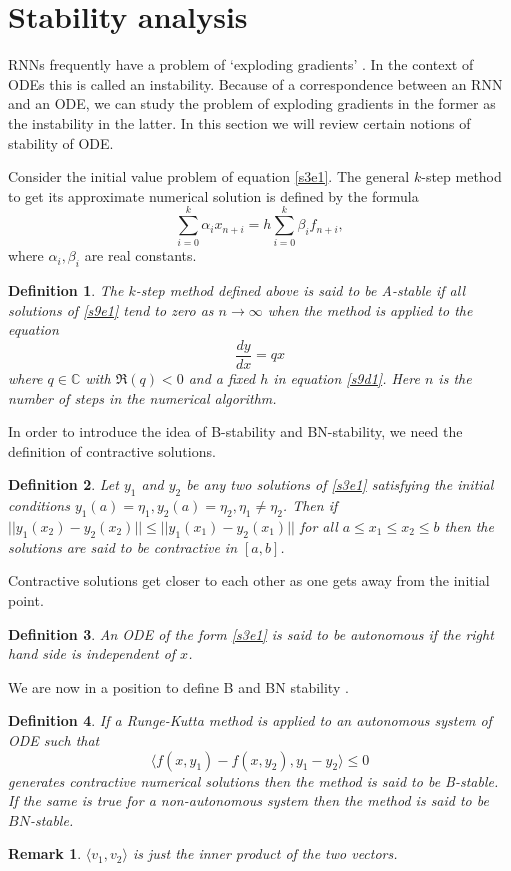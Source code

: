 \documentclass{article}
\numberwithin{equation}{section}
\newtheorem{defn}{Definition}
\newtheorem*{rem}{Remark}
\begin{document}
\section{Stability analysis}\label{s9}
RNNs frequently have a problem of `exploding gradients'
\cite{gereon2018hands}. In the context of ODEs this is called an 
instability. Because of a correspondence between an RNN and an ODE, we 
can study the problem of exploding gradients in the former as the 
instability in the latter. In this section we will review certain notions
of stability of ODE.

Consider the initial value problem of equation \eqref{s3e1}. The general
$k$-step method to get its approximate numerical solution is defined by
the formula\cite{dahlquist1963special}
\begin{equation}\label{s9e1}
\sum_{i=0}^k \alpha_i x_{n+i} = h\sum_{i=0}^k \beta_i f_{n+i},
\end{equation}
where $\alpha_i, \beta_i$ are real constants.
\begin{defn}\label{s9d1}
The $k$-step method defined above is said to be A-stable
\cite{dahlquist1963special} if all solutions of \eqref{s9e1} tend to zero 
as $n \rightarrow \infty$ when the method is applied to the equation
\[
    \frac{dy}{dx} = qx
\]
where $q \in \mathbb{C}$ with $\Re(q) < 0$ and a fixed $h$ in equation
\eqref{s9d1}. Here $n$ is the number of steps in the numerical algorithm.
\end{defn}

In order to introduce the idea of B-stability and BN-stability, we need
the definition of contractive solutions\cite{lambert1991numerical}.
\begin{defn}\label{s9d2}
Let $y_1$ and $y_2$ be any two solutions of \eqref{s3e1} satisfying the
initial conditions $y_1(a) = \eta_1, y_2(a) = \eta_2, \eta_1 \ne \eta_2$.
Then if $||y_1(x_2) - y_2(x_2)|| \le ||y_1(x_1) - y_2(x_1)||$ for all
$a \le x_1 \le x_2 \le b$ then the solutions are said to be contractive
in $[a, b]$.
\end{defn}
Contractive solutions get closer to each other as one gets away from
the initial point.

\begin{defn}\label{s9d3}
An ODE of the form \eqref{s3e1} is said to be autonomous if the right hand
side is independent of $x$.
\end{defn}

We are now in a position to define B and BN stability
\cite{lambert1991numerical}.
\begin{defn}\label{s9d4}
If a Runge-Kutta method is applied to an autonomous system of ODE such that
\[
    \langle f(x, y_1) - f(x, y_2), y_1 - y_2\rangle \le 0
\]
generates contractive numerical solutions then the method is said to be
B-stable. If the same is true for a non-autonomous system then the method
is said to be $BN$-stable.
\end{defn}
\begin{rem}
$\langle v_1, v_2 \rangle$ is just the inner product of the two vectors.
\end{rem}
\end{document}
